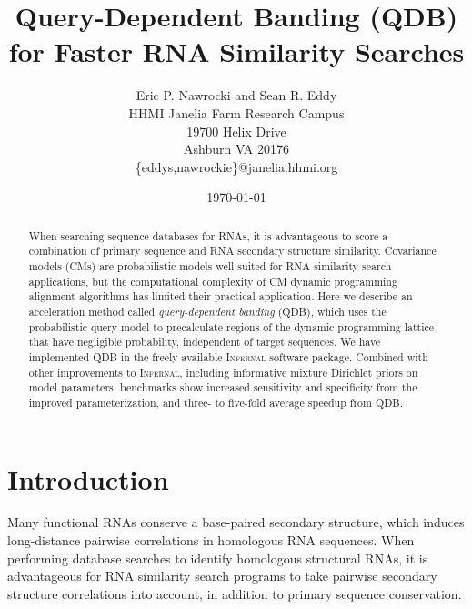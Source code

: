 \documentclass[11pt]{article}
\begin{document}
\title{Query-Dependent Banding (QDB) for Faster RNA Similarity Searches}
\author{Eric P. Nawrocki and Sean R. Eddy\\
HHMI Janelia Farm Research Campus\\
19700 Helix Drive\\
Ashburn VA 20176\\
\{eddys,nawrockie\}@janelia.hhmi.org}  
\date{\today}
\maketitle




\begin{abstract}

When searching sequence databases for RNAs, it is advantageous to
score a combination of primary sequence and RNA secondary structure
similarity.  Covariance models (CMs) are probabilistic models well
suited for RNA similarity search applications, but the computational
complexity of CM dynamic programming alignment algorithms has limited
their practical application. Here we describe an acceleration method
called \emph{query-dependent banding} (QDB), which uses the
probabilistic query model to precalculate regions of the dynamic
programming lattice that have negligible probability, independent of
target sequences. We have implemented QDB in the freely available
\textsc{Infernal} software package. Combined with other improvements
to \textsc{Infernal}, including informative mixture Dirichlet priors
on model parameters, benchmarks show increased sensitivity and
specificity from the improved parameterization, and three- to
five-fold average speedup from QDB.

\end{abstract}





\section{Introduction}

Many functional RNAs conserve a base-paired secondary structure, which
induces long-distance pairwise
correlations in homologous RNA sequences.  When
performing database searches to identify homologous structural RNAs, it is
advantageous for RNA similarity search programs to take pairwise
secondary structure correlations into account, in addition to primary
sequence conservation.
\end{document}
